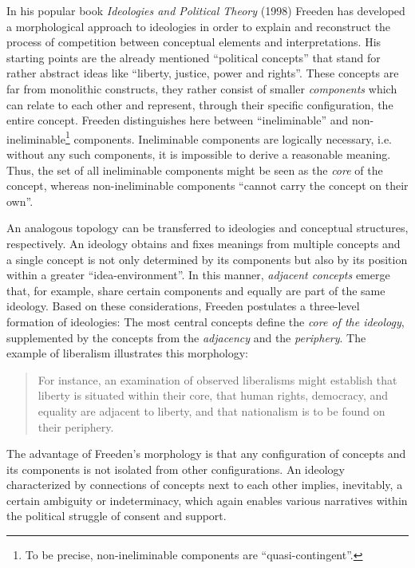 \documentclass[a4paper]{scrreprt}
\begin{document}
In his popular book {\em Ideologies and Political Theory} (1998) Freeden has developed a morphological approach to ideologies in order to explain and reconstruct the process of competition between conceptual elements and interpretations. His starting points are the already mentioned ``political concepts'' that stand for rather abstract ideas like ``liberty, justice, power and rights''. \cite[p.~54]{freeden:1998} These concepts are far from monolithic constructs, they rather consist of smaller {\em components} which can relate to each other and represent, through their specific configuration, the entire concept. Freeden distinguishes here between ``ineliminable'' and non-ineliminable\footnote{To be precise, non-ineliminable components are ``quasi-contingent''.} components. Ineliminable components are logically necessary, i.e. without any such components, it is impossible to derive a reasonable meaning. Thus, the set of all ineliminable components might be seen as the {\em core} of the concept, whereas non-ineliminable components ``cannot carry the concept on their own''. \cite[p.~62]{freeden:1998}\par
An analogous topology can be transferred to ideologies and conceptual structures, respectively. An ideology obtains and fixes meanings from multiple concepts and a single concept is not only determined by its components but also by its position within a greater ``idea-environment''. \cite[p.~67]{freeden:1998} In this manner, {\em adjacent concepts} emerge that, for example, share certain components and equally are part of the same ideology. Based on these considerations, Freeden postulates a three-level formation of ideologies: The most central concepts define the {\em core of the ideology}, supplemented by the concepts from the {\em adjacency} and the {\em periphery}. The example of liberalism illustrates this morphology:
\begin{quote}
    For instance, an examination of observed liberalisms might establish that liberty is situated within their core, that human rights, democracy, and equality are adjacent to liberty, and that nationalism is to be found on their periphery. \cite[p.~77]{freeden:1998}
\end{quote}
The advantage of Freeden’s morphology is that any configuration of concepts and its components is not isolated from other configurations. An ideology characterized by connections of concepts next to each other implies, inevitably, a certain ambiguity or indeterminacy, which again enables various narratives within the political struggle of consent and support. \cite[p.~155]{lembcke:2014}
\end{document}
